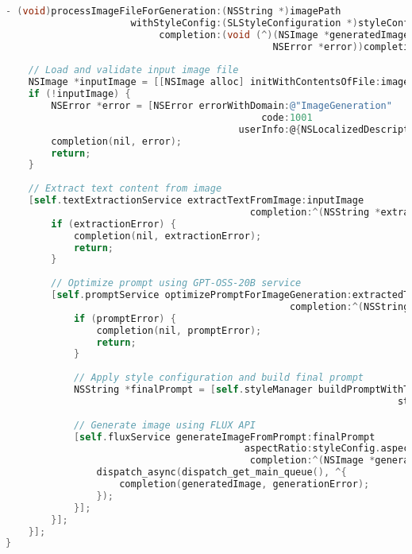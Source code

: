 \begin{lstlisting}[language=C,basicstyle=\footnotesize\ttfamily,frame=single,breaklines=true,columns=flexible,caption={Complete Image Generation Workflow Implementation},label={lst:complete_workflow}]
- (void)processImageFileForGeneration:(NSString *)imagePath 
                      withStyleConfig:(SLStyleConfiguration *)styleConfig
                           completion:(void (^)(NSImage *generatedImage, 
                                               NSError *error))completion {
    
    // Load and validate input image file
    NSImage *inputImage = [[NSImage alloc] initWithContentsOfFile:imagePath];
    if (!inputImage) {
        NSError *error = [NSError errorWithDomain:@"ImageGeneration" 
                                             code:1001 
                                         userInfo:@{NSLocalizedDescriptionKey: @"Failed to load image file"}];
        completion(nil, error);
        return;
    }
    
    // Extract text content from image
    [self.textExtractionService extractTextFromImage:inputImage
                                           completion:^(NSString *extractedText, NSError *extractionError) {
        if (extractionError) {
            completion(nil, extractionError);
            return;
        }
        
        // Optimize prompt using GPT-OSS-20B service
        [self.promptService optimizePromptForImageGeneration:extractedText
                                                  completion:^(NSString *optimizedPrompt, NSError *promptError) {
            if (promptError) {
                completion(nil, promptError);
                return;
            }
            
            // Apply style configuration and build final prompt
            NSString *finalPrompt = [self.styleManager buildPromptWithText:optimizedPrompt 
                                                                     style:styleConfig];
            
            // Generate image using FLUX API
            [self.fluxService generateImageFromPrompt:finalPrompt
                                          aspectRatio:styleConfig.aspectRatio
                                           completion:^(NSImage *generatedImage, NSError *generationError) {
                dispatch_async(dispatch_get_main_queue(), ^{
                    completion(generatedImage, generationError);
                });
            }];
        }];
    }];
}
\end{lstlisting}

